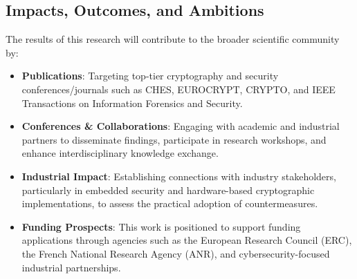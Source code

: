 \documentclass[11pt, a4paper]{article}
\begin{document}
\subsection*{Impacts, Outcomes, and Ambitions}

The results of this research will contribute to the broader scientific community by:

\begin{itemize}
\setlength{\itemsep}{0.1pt}
    \item \textbf{Publications}: Targeting top-tier cryptography and security conferences/journals such as CHES, EUROCRYPT, CRYPTO, and IEEE Transactions on Information Forensics and Security.
    \item \textbf{Conferences \& Collaborations}: Engaging with academic and industrial partners to disseminate findings, participate in research workshops, and enhance interdisciplinary knowledge exchange.
    \item \textbf{Industrial Impact}: Establishing connections with industry stakeholders, particularly in embedded security and hardware-based cryptographic implementations, to assess the practical adoption of countermeasures.
    \item \textbf{Funding Prospects}: This work is positioned to support funding applications through agencies such as the European Research Council (ERC), the French National Research Agency (ANR), and cybersecurity-focused industrial partnerships.
\end{itemize}
\end{document}
